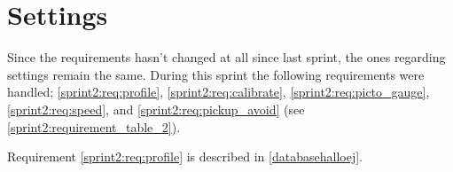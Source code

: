 \section{Settings}

Since the requirements hasn't changed at all since last sprint, the ones regarding settings remain the same.
During this sprint the following requirements were handled; \ref{sprint2:req:profile}, \ref{sprint2:req:calibrate}, \ref{sprint2:req:picto_gauge}, \ref{sprint2:req:speed}, and \ref{sprint2:req:pickup_avoid} (see \cref{sprint2:requirement_table_2}).

Requirement \ref{sprint2:req:profile} is described in \ref{databasehalloej}.